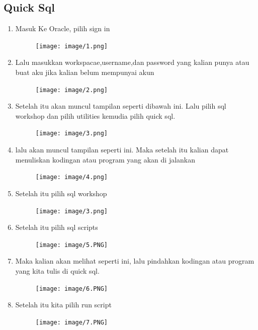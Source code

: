 \documentclass{article}
\begin{document}
\begin{enumerate}
\newpage \section{Quick Sql}
\begin{enumerate}
    \item Masuk Ke Oracle, pilih sign in
\begin{figure}[h]
            \centerline{\texttt{[image: image/1.png]}}
            \end{figure}
    \item Lalu masukkan workspacae,username,dan password yang kalian punya atau buat aku jika kalian belum mempunyai akun
    \begin{figure}[h]
            \centerline{\texttt{[image: image/2.png]}}
            \end{figure}
    \newpage \item Setelah itu akan muncul tampilan seperti dibawah ini. Lalu pilih sql workshop dan pilih utilities kemudia pilih quick sql.
    \begin{figure}[h]
            \centerline{\texttt{[image: image/3.png]}}
            \end{figure}
    \item lalu akan muncul tampilan seperti ini.  Maka setelah itu kalian dapat menuliskan kodingan atau program yang akan di jalankan
    \begin{figure}[h]
    \newpage \centerline{\texttt{[image: image/4.png]}}
\end{figure}
    \item  Setelah itu pilih sql workshop
    \begin{figure}[h]
            \centerline{\texttt{[image: image/3.png]}}
            \end{figure}
    \newpage \item Setelah itu pilih sql scripts
    \begin{figure}[h]
            \centerline{\texttt{[image: image/5.PNG]}}
            \end{figure}
    \item Maka kalian akan melihat seperti ini, lalu pindahkan kodingan atau program yang kita tulis di quick sql.
    \begin{figure}[h]
            \centerline{\texttt{[image: image/6.PNG]}}
            \end{figure}
    \newpage \item Setelah itu kita pilih run script
    \begin{figure}[h]
            \centerline{\texttt{[image: image/7.PNG]}}

\end{figure}
\end{enumerate}
\end{enumerate}
\end{document}
